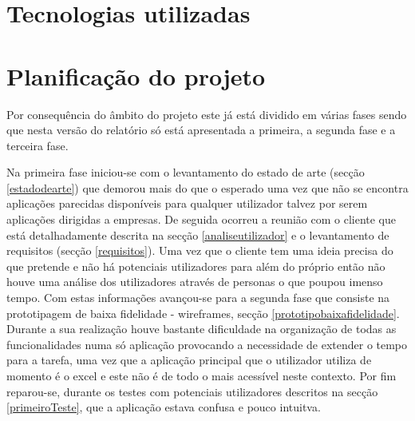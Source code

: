 \documentclass[11pt, twoside]{report}
\begin{document}
	\chapter{Tecnologias utilizadas}
	\chapter{Planificação do projeto}

 	Por consequência do âmbito do projeto este já está dividido em várias fases sendo que nesta versão do relatório só está apresentada a primeira, a segunda fase e a terceira fase.
 	
 	Na primeira fase iniciou-se com o levantamento do estado de arte (secção \ref{estadodearte}) que demorou mais do que o esperado uma vez que não se encontra aplicações parecidas disponíveis para qualquer utilizador talvez por serem aplicações dirigidas a empresas. De seguida ocorreu a reunião com o cliente que está detalhadamente descrita na secção \ref{analiseutilizador} e o levantamento de requisitos (secção \ref{requisitos}). Uma vez que o cliente tem uma ideia precisa do que pretende e não há potenciais utilizadores para além do próprio então não houve uma análise dos utilizadores através de personas o que poupou imenso tempo. Com estas informações  avançou-se para a segunda fase que consiste na prototipagem de baixa fidelidade - wireframes, secção \ref{prototipobaixafidelidade}. Durante a sua realização houve bastante dificuldade na organização de todas as funcionalidades numa só aplicação provocando a necessidade de extender o tempo para a tarefa, uma vez que a aplicação principal que o utilizador utiliza de momento é o excel e este não é de todo o mais acessível neste contexto. Por fim reparou-se, durante os testes com potenciais utilizadores descritos na secção \ref{primeiroTeste}, que a aplicação estava confusa e pouco intuitva.  
	
\end{document}
